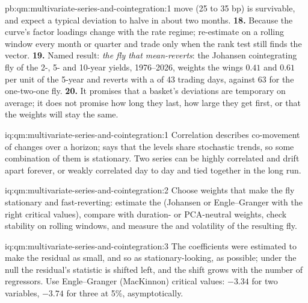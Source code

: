 \begin{solution}{pb:qm:multivariate-series-and-cointegration:1}
move (25 to 35 bp) is survivable, and expect a typical deviation to halve in about two months.
\textbf{18.} Because the curve's factor loadings change with the rate regime; re-estimate on a rolling window every month or quarter and trade only when the rank test
still finds the vector.
\textbf{19.} Named result: \emph{the fly that mean-reverts}: the Johansen cointegrating fly of the 2-, 5- and 10-year yields, 1976--2026, weights the wings $0.41$ and $0.61$ per
unit of the 5-year and reverts with a  of 43 trading days, against 63 for the one-two-one fly.
\textbf{20.} It promises that a basket's deviations are temporary on average; it does not promise how long they last, how large they get first, or that the weights will
stay the same.
\end{solution}

\begin{solution}{iq:qm:multivariate-series-and-cointegration:1}
Correlation describes co-movement of changes over a horizon;  says that the levels share stochastic trends, so some combination of them is stationary. Two
series can be highly correlated and drift apart forever, or weakly correlated day to day and tied together in the long run.
\end{solution}

\begin{solution}{iq:qm:multivariate-series-and-cointegration:2}
Choose weights that make the fly stationary and fast-reverting: estimate the  (Johansen or Engle--Granger with the right critical values),
compare with duration- or PCA-neutral weights, check stability on rolling windows, and measure the  and volatility of the resulting fly.
\end{solution}

\begin{solution}{iq:qm:multivariate-series-and-cointegration:3}
The coefficients were estimated to make the residual as small, and so as stationary-looking, as possible; under the null the residual's statistic is shifted left, and the
shift grows with the number of regressors. Use Engle--Granger (MacKinnon) critical values: $-3.34$ for two variables, $-3.74$ for three at 5\%, asymptotically.
\end{solution}

